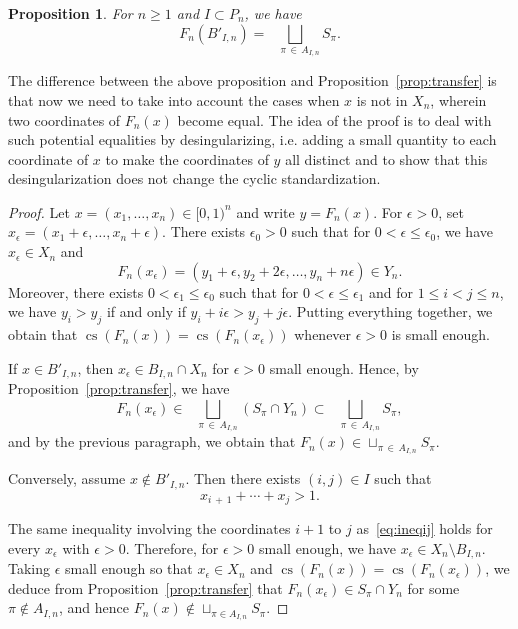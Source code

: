 \documentclass[11pt]{article}
\newtheorem{prop}[theo]{Proposition}
\theoremstyle{definition}
\numberwithin{equation}{section}
\numberwithin{figure}{section}
\numberwithin{table}{section}
\DeclareMathOperator{\cs}{cs}
\begin{document}
\begin{prop}\label{prop:transferhalfopen}
For $n\geq1$ and $I\subset P_n$, we have
\[
F_n(B'_{I,n}) =\!\!\!\!\!\!\bigsqcup_{\quad\pi\,\in\,A_{I,n}} S_\pi.
\]
\end{prop}

The difference between the above proposition and Proposition~\ref{prop:transfer} is that now we need to take into account the cases when $x$ is not in $X_n$, wherein two coordinates of $F_n(x)$ become equal. The idea of the proof is to deal with such potential equalities by desingularizing, i.e. adding a small quantity to each coordinate of $x$ to make the coordinates of $y$ all distinct and to show that this desingularization does not change the cyclic standardization.

\begin{proof}
Let $x=(x_1,\ldots,x_n)\in[0,1)^n$ and write $y=F_n(x)$. For $\epsilon>0$, set $x_\epsilon=(x_1+\epsilon,\ldots,x_n+\epsilon)$. There exists $\epsilon_0>0$ such that for $0<\epsilon \leq \epsilon_0$, we have $x_\epsilon \in X_n$ and
\[
F_n(x_\epsilon)= (y_1 + \epsilon, y_2 + 2\epsilon, \dots, y_n + n \epsilon) \in Y_n.
\]
Moreover, there exists $0<\epsilon_1 \leq \epsilon_0$ such that for $0 < \epsilon \leq \epsilon_1$ and for $1\leq i<j \leq n$, we have $y_i > y_j$ if and only if $y_i + i \epsilon > y_j + j \epsilon$. Putting everything together, we obtain that $\cs(F_n(x))=\cs(F_n(x_\epsilon))$ whenever $\epsilon>0$ is small enough.

If $x\in B'_{I,n}$, then $x_\epsilon \in B_{I,n}\cap X_n$ for $\epsilon>0$ small enough. Hence, by Proposition~\ref{prop:transfer}, we have
\[
F_n(x_\epsilon)\in\!\!\!\!\!\bigsqcup_{\quad\pi\,\in\,A_{I,n}} (S_\pi \cap Y_n) \subset\!\!\!\!\!\bigsqcup_{\quad\pi\,\in\,A_{I,n}} S_\pi,
\]
and by the previous paragraph, we obtain that $F_n(x)\in \sqcup_{\pi\,\in\,A_{I,n}} S_\pi$.

Conversely, assume $x\notin B'_{I,n}$. Then there exists $(i,j)\in I$ such that
\begin{equation}\label{eq:ineqij}
x_{i\,+\,1}+\cdots+x_j >1.
\end{equation}

The same inequality involving the coordinates $i+1$ to $j$ as~\eqref{eq:ineqij} holds for every $x_\epsilon$ with $\epsilon>0$. Therefore, for $\epsilon>0$ small enough, we have $x_\epsilon \in X_n \setminus B_{I,n}$. Taking $\epsilon$ small enough so that $x_\epsilon \in X_n$ and $\cs(F_n(x))=\cs(F_n(x_\epsilon))$, we deduce from Proposition~\ref{prop:transfer} that $F_n(x_\epsilon)\in S_\pi \cap Y_n$ for some $\pi \notin A_{I,n}$, and hence $F_n(x) \notin \sqcup_{\pi\in A_{I,n}} S_\pi$.
\end{proof}
\end{document}

